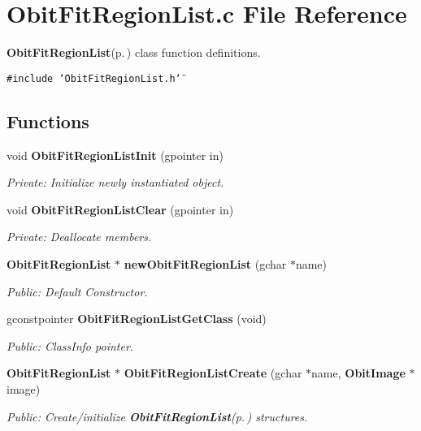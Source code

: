 \section{Obit\-Fit\-Region\-List.c File Reference}
\label{ObitFitRegionList_8c}
{\bf Obit\-Fit\-Region\-List}{\rm (p.\,\pageref{structObitFitRegionList})} class function definitions. 

{\tt \#include \char`\"{}Obit\-Fit\-Region\-List.h\char`\"{}}\par
\subsection*{Functions}
\begin{CompactItemize}
\item 
void {\bf Obit\-Fit\-Region\-List\-Init} (gpointer in)
\begin{CompactList}\small\item\em Private: Initialize newly instantiated object. \item\end{CompactList}\item 
void {\bf Obit\-Fit\-Region\-List\-Clear} (gpointer in)
\begin{CompactList}\small\item\em Private: Deallocate members. \item\end{CompactList}\item 
{\bf Obit\-Fit\-Region\-List} $\ast$ {\bf new\-Obit\-Fit\-Region\-List} (gchar $\ast$name)
\begin{CompactList}\small\item\em Public: Default Constructor. \item\end{CompactList}\item 
gconstpointer {\bf Obit\-Fit\-Region\-List\-Get\-Class} (void)
\begin{CompactList}\small\item\em Public: Class\-Info pointer. \item\end{CompactList}\item 
{\bf Obit\-Fit\-Region\-List} $\ast$ {\bf Obit\-Fit\-Region\-List\-Create} (gchar $\ast$name, {\bf Obit\-Image} $\ast$image)
\begin{CompactList}\small\item\em Public: Create/initialize {\bf Obit\-Fit\-Region\-List}{\rm (p.\,\pageref{structObitFitRegionList})} structures. \item\end{CompactList}\item 

\end{CompactItemize}
